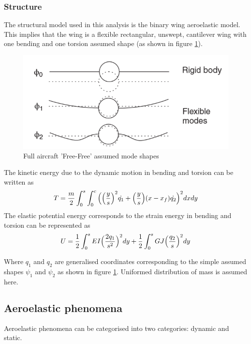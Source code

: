 \documentclass[11pt]{article}
\begin{document}
\subsubsection{Structure}
The structural model used in this analysis is the binary wing aeroelastic model. This implies that the wing is a flexible rectangular, unswept, cantilever wing with one bending and one torsion assumed shape (as shown in figure \ref{fig:free-free}).
\begin{figure}[H]
    \centering
    \includegraphics[width = .6\textwidth]{figures/free-free-mode-shape.png}
    \caption{Full aircraft 'Free-Free' assumed mode shapes}
    \label{fig:free-free}
\end{figure}
The kinetic energy due to the dynamic motion in bending and torsion can be written as
\begin{equation}
    T = \frac{m}{2}\int_0^s \int_0^c \Big( \Big{(} \frac{y}{s}\Big{)}^2\dot{q_1}+\Big{(}\frac{y}{s}\Big{)}(x-x_f)\dot{q_2}\Big{)}^2dxdy
\end{equation}
The elastic potential energy corresponds to the strain energy in bending and torsion can be represented as
\begin{equation}
    U = \frac{1}{2}\int_0^s EI \Big{(}\frac{2q_1}{s^2}\Big{)}^2dy+\frac{1}{2}\int_0^sGJ\Big{(}\frac{q_2}{s}\Big{)}^2dy
\end{equation}

Where $q_1$ and $q_2$ are generalised coordinates corresponding to the simple assumed shapes $\psi_1$ and $\psi_2$ as shown in figure \ref{fig:free-free}. Uniformed distribution of mass is assumed here. 


\subsection{Aeroelastic phenomena}
Aeroelastic phenomena can be categorised into two categories: dynamic and static.

\end{document}
